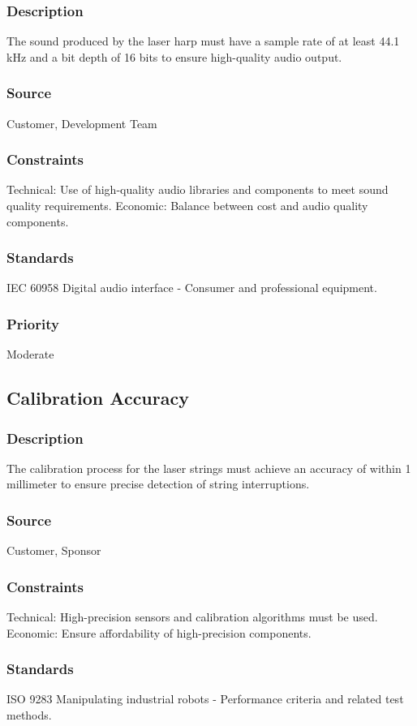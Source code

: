 \subsubsection{Description}
The sound produced by the laser harp must have a sample rate of at least 44.1 kHz and a bit depth of 16 bits to ensure high-quality audio output.
\subsubsection{Source}
Customer, Development Team
\subsubsection{Constraints}
Technical: Use of high-quality audio libraries and components to meet sound quality requirements.
Economic: Balance between cost and audio quality components.
\subsubsection{Standards}
IEC 60958 Digital audio interface - Consumer and professional equipment.
\subsubsection{Priority}
Moderate


\subsection{Calibration Accuracy}
\subsubsection{Description}
The calibration process for the laser strings must achieve an accuracy of within 1 millimeter to ensure precise detection of string interruptions.
\subsubsection{Source}
Customer, Sponsor
\subsubsection{Constraints}
Technical: High-precision sensors and calibration algorithms must be used.
Economic: Ensure affordability of high-precision components.
\subsubsection{Standards}
ISO 9283 Manipulating industrial robots - Performance criteria and related test methods.
